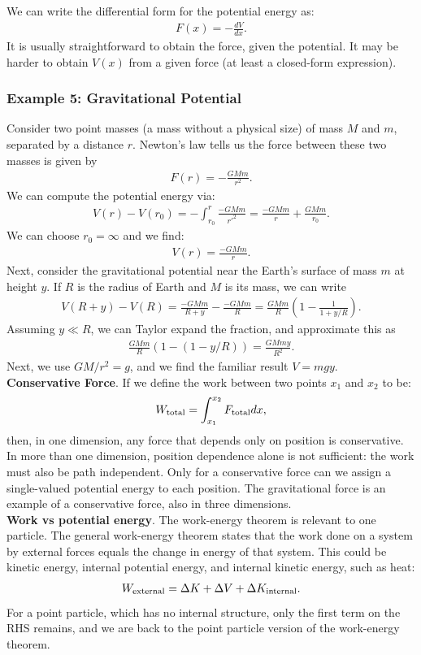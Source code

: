 \documentclass[12pt]{article}
\newcommand{\be}{\begin{eqnarray}}
\newcommand{\ee}{\end{eqnarray}}
\begin{document}
We can write the differential form for the potential energy as:
\be
F(x) = - \frac{dV}{dx}.
\ee
It is usually straightforward to obtain the force, given the potential. It may be harder to obtain $V(x)$ from a given force (at least a closed-form expression). 

\subsubsection*{Example 5: Gravitational Potential}
Consider two point masses (a mass without a physical size) of mass $M$ and $m$, separated by a distance $r$. Newton's law tells us the force between these two masses is given by 
\be
F(r) = -\frac{GMm}{r^2}.
\ee
We can compute the potential energy via:
\be
V(r) - V(r_0) = - \int_{r_0}^r \frac{-G M m}{r'^2} = \frac{-GMm}{r} + \frac{GMm}{r_0}.
\ee
We can choose $r_0 = \infty$ and we find:
\be
V(r) = \frac{-GMm}{r}. 
\ee
Next, consider the gravitational potential near the Earth's surface of mass $m$ at height $y$. If $R$ is the radius of Earth and $M$ is its mass, we can write 
\be
V(R+y) - V(R) = \frac{-GMm}{R+y} - \frac{-GMm}{R} = \frac{GMm}{R} \left(1-\frac{1}{1+y/R}\right). 
\ee
Assuming $y \ll R$, we can Taylor expand the fraction, and approximate this as
\be
\frac{GMm}{R}\left(1-(1-y/R)\right) = \frac{GMmy}{R^2}.
\ee
Next, we use $GM/r^2 = g$, and we find the familiar result $V = mgy$. \\

\noindent
{\bf Conservative Force}. If we define the work between two points $x_1$ and $x_2$ to be:
\be
W_{\rm total} = \int_{x_1}^{x_2} F_{\rm total} dx,
\ee
then, in one dimension, any force that depends only on position is conservative. In more than one dimension, position dependence alone is not sufficient: the work must also be path independent. Only for a conservative force can we assign a single-valued potential energy to each position. The gravitational force is an example of a conservative force, also in three dimensions.
\\

\noindent
{\bf Work vs potential energy}.
The work-energy theorem is relevant to one particle. The general work-energy theorem states that the work done on a system by external forces equals the change in energy of that system. This could be kinetic energy, internal potential energy, and internal kinetic energy, such as heat:
\be
W_{\rm external} = \Delta K + \Delta V + \Delta K_{\rm internal}.
\ee
For a point particle, which has no internal structure, only the first term on the RHS remains, and we are back to the point particle version of the work-energy theorem. 
\end{document}
